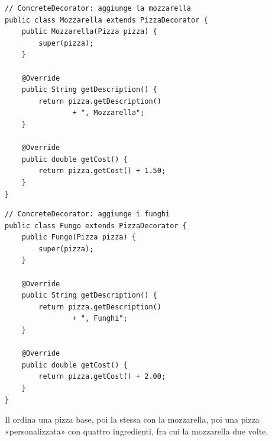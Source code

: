 \noindent\begin{minipage}[t]{0.49\textwidth}
\begin{lstlisting}[style=java, name=Mozzarella.java]
// ConcreteDecorator: aggiunge la mozzarella
public class Mozzarella extends PizzaDecorator {
    public Mozzarella(Pizza pizza) {
        super(pizza);
    }

    @Override
    public String getDescription() {
        return pizza.getDescription()
                + ", Mozzarella";
    }

    @Override
    public double getCost() {
        return pizza.getCost() + 1.50;
    }
}
\end{lstlisting}
\end{minipage}\hfill
\begin{minipage}[t]{0.49\textwidth}
\begin{lstlisting}[style=java, name=Fungo.java]
// ConcreteDecorator: aggiunge i funghi
public class Fungo extends PizzaDecorator {
    public Fungo(Pizza pizza) {
        super(pizza);
    }

    @Override
    public String getDescription() {
        return pizza.getDescription()
                + ", Funghi";
    }

    @Override
    public double getCost() {
        return pizza.getCost() + 2.00;
    }
}
\end{lstlisting}
\end{minipage}

Il  ordina una pizza base, poi la stessa con la mozzarella, poi una pizza «personalizzata» con quattro ingredienti,
fra cui la mozzarella due volte.

